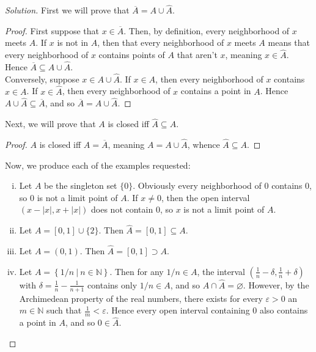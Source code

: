 \documentclass[12pt]{article}
\newenvironment{solution}
  {\renewcommand\qedsymbol{$\blacksquare$}\begin{proof}[Solution]}
{\end{proof}}
\newenvironment{sproof}{
  \renewcommand\qedsymbol{$\square$}
  \begin{proof}
  }{
  \end{proof}
}
\begin{document}
\begin{solution}
  First we will prove that $\overline{A}=A\cup\widehat{A}$.
  \begin{sproof}
    First suppose that $x\in\overline{A}$.
    Then, by definition, every neighborhood of $x$ meets $A$.
    If $x$ is not in $A$, then that every neighborhood of $x$ meets $A$ means that every neighborhood of
    $x$ contains points of $A$ that aren't $x$, meaning $x\in\widehat{A}$.
    Hence $\overline{A}\subseteq A\cup\widehat{A}$.\\\indent
    Conversely, suppose $x\in A\cup\widehat{A}$.
    If $x\in A$, then every neighborhood of $x$ contains $x\in A$.
    If $x\in \widehat{A}$, then every neighborhood of $x$ contains a point in $A$.
    Hence $A\cup\widehat{A}\subseteq \overline{A}$, and so $\overline{A} = A\cup\widehat{A}$.
  \end{sproof}
  Next, we will prove that $A$ is closed iff $\widehat{A}\subseteq A$.
  \begin{sproof}
    $A$ is closed iff $A=\overline{A}$, meaning $A=A\cup\widehat{A}$, whence $\widehat{A}\subseteq{A}$.
  \end{sproof}
  Now, we produce each of the examples requested:
  \begin{enumerate}[(i)]
    \item Let $A$ be the singleton set $\{0\}$.
      Obviously every neighborhood of 0 contains 0, so 0 is not a limit point of $A$.
      If $x\neq0$, then the open interval $(x-|x|, x+|x|)$ does not contain $0$, 
      so $x$ is not a limit point of $A$.

    \item Let $A = [0, 1] \cup \{2\}$.
      Then $\widehat{A} = [0,1]\subseteq A$.

    \item Let $A=(0,1)$. 
      Then $\widehat{A}=[0,1]\supset A$.

    \item Let $A = \left\{ 1/n\  |\  n\in\mathbb{N} \right\}$.
      Then for any $1/n\in A$, the interval $\left(\frac{1}{n}-\delta,\frac{1}{n}+\delta\right)$ 
      with $\delta=\frac{1}{n} - \frac{1}{n+1}$ contains only $1/n\in A$, 
      and so $A\cap\widehat{A}=\varnothing.$
      However, by the Archimedean property of the real numbers, there exists for every 
      $\varepsilon>0$ an $m\in\mathbb{N}$ such that $\frac{1}{m} < \varepsilon$.
      Hence every open interval containing $0$ also contains a point in $A$, and so $0\in\widehat{A}$. 
  \end{enumerate}
\end{solution}
\end{document}
